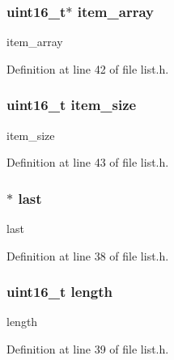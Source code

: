 \subsubsection[{item\+\_\+array}]{\setlength{\rightskip}{0pt plus 5cm}uint16\+\_\+t$\ast$ item\+\_\+array}\label{structlist__t_a3826fdc3e2faf8cbe23972788ca9c3ba}


item\+\_\+array 



Definition at line 42 of file list.\+h.

\hypertarget{structlist__t_a5f3a65f91da217e59d1f0d9069a23b07}{}
\subsubsection[{item\+\_\+size}]{\setlength{\rightskip}{0pt plus 5cm}uint16\+\_\+t item\+\_\+size}\label{structlist__t_a5f3a65f91da217e59d1f0d9069a23b07}


item\+\_\+size 



Definition at line 43 of file list.\+h.

\hypertarget{structlist__t_a4a78182ec1f0fe115d1a5dba9bc3341f}{}
\subsubsection[{last}]{$\ast$ last}\label{structlist__t_a4a78182ec1f0fe115d1a5dba9bc3341f}


last 



Definition at line 38 of file list.\+h.

\hypertarget{structlist__t_a1892eba2086d12ac2b09005aeb09ea3b}{}
\subsubsection[{length}]{\setlength{\rightskip}{0pt plus 5cm}uint16\+\_\+t length}\label{structlist__t_a1892eba2086d12ac2b09005aeb09ea3b}


length 



Definition at line 39 of file list.\+h.

